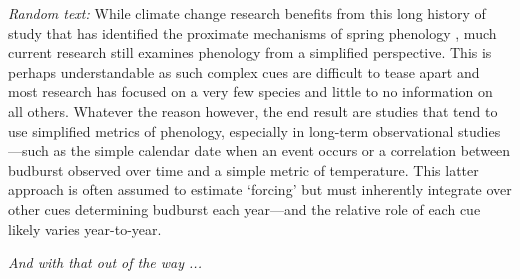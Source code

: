 \documentclass[11pt,letterpaper]{article}
\begin{document}
\emph{Random text:} While climate change research benefits from this long history of study that has identified the proximate mechanisms of spring phenology \citep{chuinearees}, much current research still examines phenology from a simplified perspective. This is perhaps understandable as such complex cues are difficult to tease apart and most research has focused on a very few species and little to no information on all others. Whatever the reason however, the end result are studies that tend to use simplified metrics of phenology, especially in long-term observational studies---such as the simple calendar date when an event occurs or a correlation between budburst observed over time and a simple metric of temperature. This latter approach is often assumed to estimate `forcing' but must inherently integrate over other cues determining budburst each year---and the relative role of each cue likely varies year-to-year. 

\emph{And with that out of the way ...}\\
\end{document}
